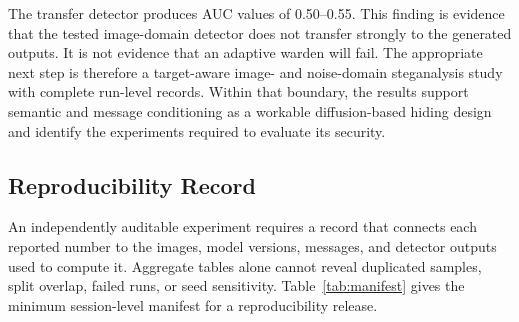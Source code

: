 \documentclass[pdflatex,sn-mathphys-num]{sn-jnl}
\begin{document}
The transfer detector produces AUC values of 0.50--0.55. This finding is evidence that the tested image-domain detector does not transfer strongly to the generated outputs. It is not evidence that an adaptive warden will fail. The appropriate next step is therefore a target-aware image- and noise-domain steganalysis study with complete run-level records. Within that boundary, the results support semantic and message conditioning as a workable diffusion-based hiding design and identify the experiments required to evaluate its security.

\begin{appendices}

\section{Reproducibility Record}
\label{app:reproducibility}

An independently auditable experiment requires a record that connects each reported number to the images, model versions, messages, and detector outputs used to compute it. Aggregate tables alone cannot reveal duplicated samples, split overlap, failed runs, or seed sensitivity. Table~\ref{tab:manifest} gives the minimum session-level manifest for a reproducibility release.


\end{appendices}
\end{document}
